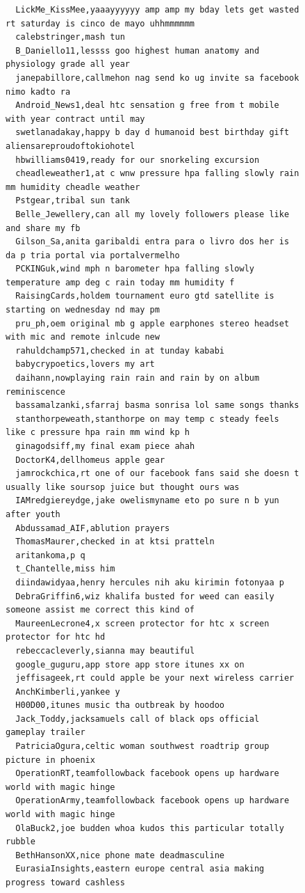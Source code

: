 \begin{figure}[htpb]
\begin{verbatim}
  LickMe_KissMee,yaaayyyyyy amp amp my bday lets get wasted rt saturday is cinco de mayo uhhmmmmmm
  calebstringer,mash tun
  B_Daniello11,lessss goo highest human anatomy and physiology grade all year
  janepabillore,callmehon nag send ko ug invite sa facebook nimo kadto ra
  Android_News1,deal htc sensation g free from t mobile with year contract until may
  swetlanadakay,happy b day d humanoid best birthday gift aliensareproudoftokiohotel
  hbwilliams0419,ready for our snorkeling excursion
  cheadleweather1,at c wnw pressure hpa falling slowly rain mm humidity cheadle weather
  Pstgear,tribal sun tank
  Belle_Jewellery,can all my lovely followers please like and share my fb
  Gilson_Sa,anita garibaldi entra para o livro dos her is da p tria portal via portalvermelho
  PCKINGuk,wind mph n barometer hpa falling slowly temperature amp deg c rain today mm humidity f
  RaisingCards,holdem tournament euro gtd satellite is starting on wednesday nd may pm
  pru_ph,oem original mb g apple earphones stereo headset with mic and remote inlcude new
  rahuldchamp571,checked in at tunday kababi
  babycrypoetics,lovers my art
  daihann,nowplaying rain rain and rain by on album reminiscence
  bassamalzanki,sfarraj basma sonrisa lol same songs thanks
  stanthorpeweath,stanthorpe on may temp c steady feels like c pressure hpa rain mm wind kp h
  ginagodsiff,my final exam piece ahah
  DoctorK4,dellhomeus apple gear
  jamrockchica,rt one of our facebook fans said she doesn t usually like soursop juice but thought ours was
  IAMredgiereydge,jake owelismyname eto po sure n b yun after youth
  Abdussamad_AIF,ablution prayers
  ThomasMaurer,checked in at ktsi pratteln
  aritankoma,p q
  t_Chantelle,miss him
  diindawidyaa,henry hercules nih aku kirimin fotonyaa p
  DebraGriffin6,wiz khalifa busted for weed can easily someone assist me correct this kind of
  MaureenLecrone4,x screen protector for htc x screen protector for htc hd
  rebeccacleverly,sianna may beautiful
  google_guguru,app store app store itunes xx on
  jeffisageek,rt could apple be your next wireless carrier
  AnchKimberli,yankee y
  H00D00,itunes music tha outbreak by hoodoo
  Jack_Toddy,jacksamuels call of black ops official gameplay trailer
  PatriciaOgura,celtic woman southwest roadtrip group picture in phoenix
  OperationRT,teamfollowback facebook opens up hardware world with magic hinge
  OperationArmy,teamfollowback facebook opens up hardware world with magic hinge
  OlaBuck2,joe budden whoa kudos this particular totally rubble
  BethHansonXX,nice phone mate deadmasculine
  EurasiaInsights,eastern europe central asia making progress toward cashless

\end{verbatim}
\end{figure}
